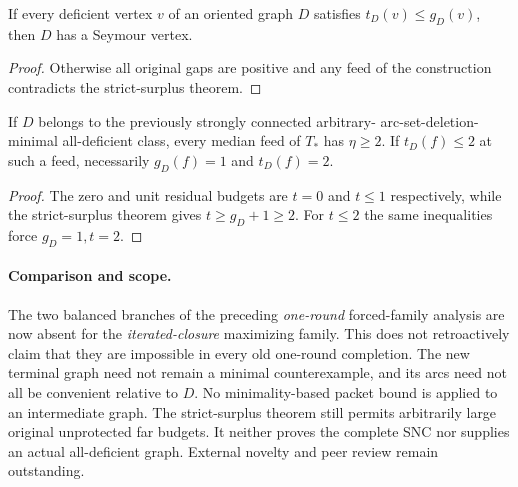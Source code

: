 \begin{corollary}
\label{cor:iterated-closure-low-far-budget}
If every deficient vertex $v$ of an oriented graph $D$ satisfies
$t_D(v)\le g_D(v)$, then $D$ has a Seymour vertex.
\end{corollary}
\begin{proof}
Otherwise all original gaps are positive and any feed of the construction
contradicts the strict-surplus theorem.
\end{proof}

\begin{corollary}
\label{cor:iterated-closure-nonunit-feed}
If $D$ belongs to the previously strongly connected arbitrary-
arc-set-deletion-minimal all-deficient class, every median feed of $T_*$
has $\eta\ge2$. If $t_D(f)\le2$ at such a feed, necessarily
$g_D(f)=1$ and $t_D(f)=2$.
\end{corollary}
\begin{proof}
The zero and unit residual budgets are $t=0$ and $t\le1$ respectively,
while the strict-surplus theorem gives $t\ge g_D+1\ge2$. For $t\le2$
the same inequalities force $g_D=1,t=2$.
\end{proof}

\paragraph{Comparison and scope.}
The two balanced branches of the preceding \emph{one-round} forced-family
analysis are now absent for the \emph{iterated-closure} maximizing family.
This does not retroactively claim that they are impossible in every old
one-round completion. The new terminal graph need not remain a minimal
counterexample, and its arcs need not all be convenient relative to $D$.
No minimality-based packet bound is applied to an intermediate graph.
The strict-surplus theorem still permits arbitrarily large original
unprotected far budgets. It neither proves the complete SNC nor supplies
an actual all-deficient graph. External novelty and peer review remain
outstanding.

